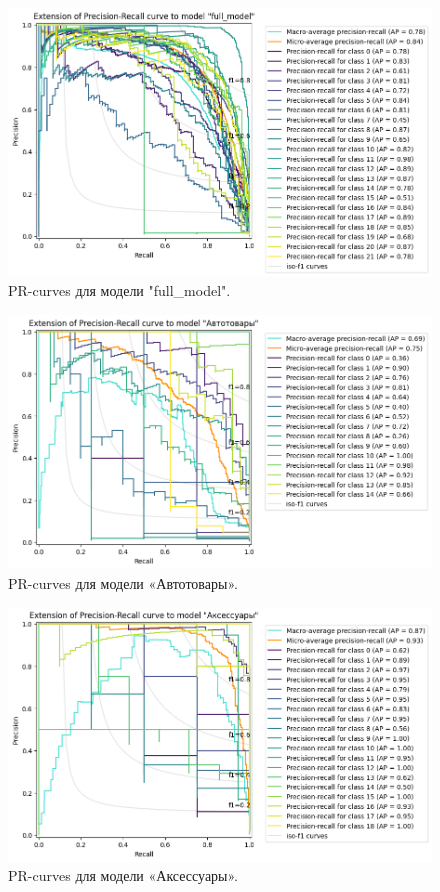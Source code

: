 \documentclass[a4paper,12pt]{extarticle}
\begin{document}
\begin{figure}[hbtp]
	\centering
	\includegraphics[scale=0.7]{pr_curves/prcurve_full_model.png}
	\caption{PR-curves для модели "full\_model".}
	\label{fig:prcurve_full_model}
\end{figure}

\begin{figure}[hbtp]
	\centering
	\includegraphics[scale=0.7]{pr_curves/prcurve_Автотовары.png}
	\caption{PR-curves для модели «Автотовары».}
	\label{fig:prcurve_Автотовары}
\end{figure}

\begin{figure}[hbtp]
	\centering
	\includegraphics[scale=0.7]{pr_curves/prcurve_Аксессуары.png}
	\caption{PR-curves для модели «Аксессуары».}
	\label{fig:prcurve_Аксессуары}
\end{figure}
\end{document}
